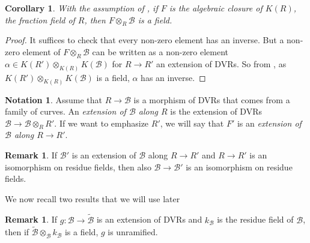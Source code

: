 \documentclass{amsart}
\newcommand{\cB}{\mathcal{B}}
\newcommand{\qB}{R}
\newcommand{\qR}{\cB}
\newtheorem{Cor}[theorem]{Corollary}
\theoremstyle{definition}
\newtheorem{Oss}[theorem]{Remark}
\newtheorem{Notation}[theorem]{Notation}
\begin{document}
\begin{Cor}\label{corollary R otimes B K(B) is a field}
With the assumption of , if $F$ is the algebraic closure of $K(\qB)$, the fraction field of $\qB$, then $F\otimes_\qB \qR$ is a field. 
\end{Cor}
\begin{proof}
It suffices to check that every non-zero element has an inverse. But a non-zero element of $F\otimes_\qB \qR$ can be written as a non-zero element $\alpha \in K(\qB')\otimes_{K(\qB)}K(\qR)$ for $\qB\to \qB'$ an extension of DVRs. So from , as $K(\qB')\otimes_{K(\qB)}K(\qR)$ is a field, $\alpha$ has an inverse.
\end{proof}
\begin{Notation}
 Assume that $\qB\to \qR$ is a morphism of DVRs that comes from a family of curves. An \textit{extension of $\qR$ along $\qB$} is the extension of DVRs $\qR\to \qR\otimes_\qB \qB'$.
 If we want to emphasize $\qB'$, we will say that $F'$ is an \textit{extension of $\qR$ along $\qB\to \qB'$}.
\end{Notation}
\begin{Oss}\label{rmk iso on fraction fields for extensions along B}
If $\qR'$ is an extension of $\qR$ along $\qB\to \qB'$ and $\qB\to \qB'$ is an isomorphism on residue fields, then also $\qR\to \qR'$ is an isomorphism on residue fields. 
\end{Oss}
We now recall two results that we will use later 
\begin{Oss}\label{remark unramified extension if the fiber of residue field is a field}
If $g:\qR\to \widetilde{\qR}$ is an extension of DVRs and $k_\qR$ is the residue field of $\qR$, then if $\widetilde{\qR}\otimes_\qR k_\qR$ is a field, $g$ is unramified.
\end{Oss}
\end{document}
